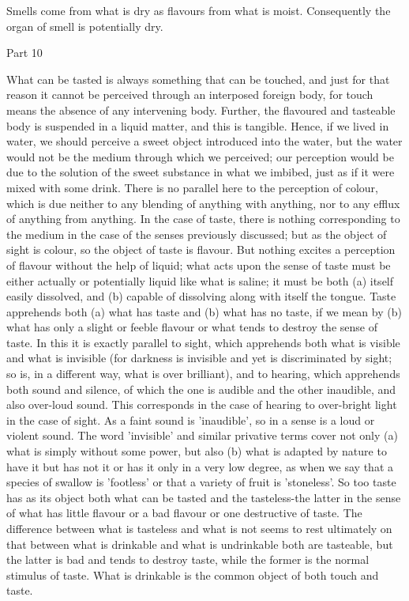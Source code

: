Smells come from what is dry as flavours from what is moist. Consequently
the organ of smell is potentially dry. 

Part 10

What can be tasted is always something that can be touched, and just
for that reason it cannot be perceived through an interposed foreign
body, for touch means the absence of any intervening body. Further,
the flavoured and tasteable body is suspended in a liquid matter,
and this is tangible. Hence, if we lived in water, we should perceive
a sweet object introduced into the water, but the water would not
be the medium through which we perceived; our perception would be
due to the solution of the sweet substance in what we imbibed, just
as if it were mixed with some drink. There is no parallel here to
the perception of colour, which is due neither to any blending of
anything with anything, nor to any efflux of anything from anything.
In the case of taste, there is nothing corresponding to the medium
in the case of the senses previously discussed; but as the object
of sight is colour, so the object of taste is flavour. But nothing
excites a perception of flavour without the help of liquid; what acts
upon the sense of taste must be either actually or potentially liquid
like what is saline; it must be both (a) itself easily dissolved,
and (b) capable of dissolving along with itself the tongue. Taste
apprehends both (a) what has taste and (b) what has no taste, if we
mean by (b) what has only a slight or feeble flavour or what tends
to destroy the sense of taste. In this it is exactly parallel to sight,
which apprehends both what is visible and what is invisible (for darkness
is invisible and yet is discriminated by sight; so is, in a different
way, what is over brilliant), and to hearing, which apprehends both
sound and silence, of which the one is audible and the other inaudible,
and also over-loud sound. This corresponds in the case of hearing
to over-bright light in the case of sight. As a faint sound is 'inaudible',
so in a sense is a loud or violent sound. The word 'invisible' and
similar privative terms cover not only (a) what is simply without
some power, but also (b) what is adapted by nature to have it but
has not it or has it only in a very low degree, as when we say that
a species of swallow is 'footless' or that a variety of fruit is 'stoneless'.
So too taste has as its object both what can be tasted and the tasteless-the
latter in the sense of what has little flavour or a bad flavour or
one destructive of taste. The difference between what is tasteless
and what is not seems to rest ultimately on that between what is drinkable
and what is undrinkable both are tasteable, but the latter is bad
and tends to destroy taste, while the former is the normal stimulus
of taste. What is drinkable is the common object of both touch and
taste. 

